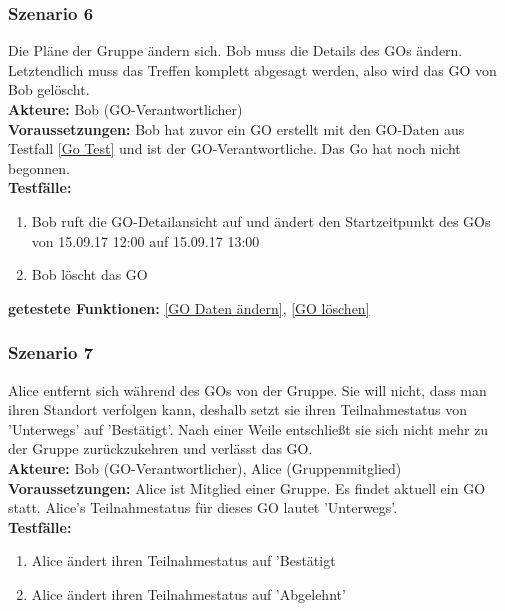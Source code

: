 \documentclass[parskip=full]{scrartcl}
\def\threedigits#1{%
  \ifnum#1<100 0\fi
  \ifnum#1<10 0\fi
  \number#1}
\begin{document}
\subsubsection*{Szenario 6} Die Pläne der Gruppe ändern sich. Bob muss die Details des GOs ändern. Letztendlich muss das Treffen komplett abgesagt werden, also wird das GO von Bob gelöscht.\\

\textbf{Akteure:} Bob (GO-Verantwortlicher)\\

\textbf{Voraussetzungen: }Bob hat zuvor ein GO erstellt mit den GO-Daten aus Testfall \ref{Go Test} und ist der GO-Verantwortliche. Das Go hat noch nicht begonnen.\\

\textbf{Testfälle:}
\begin{enumerate}[label={\textbf{/T\protect\threedigits{\theenumi}0/}}, leftmargin=*, resume]
	\item Bob ruft die GO-Detailansicht auf und ändert den Startzeitpunkt des GOs von 15.09.17 12:00 auf 15.09.17 13:00
	\item Bob löscht das GO
\end{enumerate}

\textbf{getestete Funktionen: }\ref{GO Daten ändern}, \ref{GO löschen}

\subsubsection*{Szenario 7}Alice entfernt sich während des GOs von der Gruppe. Sie will nicht, dass man ihren Standort verfolgen kann, deshalb setzt sie ihren Teilnahmestatus von 'Unterwegs' auf 'Bestätigt'. Nach einer Weile entschließt sie sich nicht mehr zu der Gruppe zurückzukehren und verlässt das GO.\\

\textbf{Akteure:} Bob (GO-Verantwortlicher), Alice (Gruppenmitglied)\\

\textbf{Voraussetzungen: }Alice ist Mitglied einer Gruppe. Es findet aktuell ein GO statt. Alice's Teilnahmestatus für dieses GO lautet 'Unterwegs'.\\

\textbf{Testfälle:}
\begin{enumerate}[label={\textbf{/T\protect\threedigits{\theenumi}0/}}, leftmargin=*, resume]
	\item Alice ändert ihren Teilnahmestatus auf 'Bestätigt
	\item Alice ändert ihren Teilnahmestatus auf 'Abgelehnt'
\end{enumerate}
\end{document}
